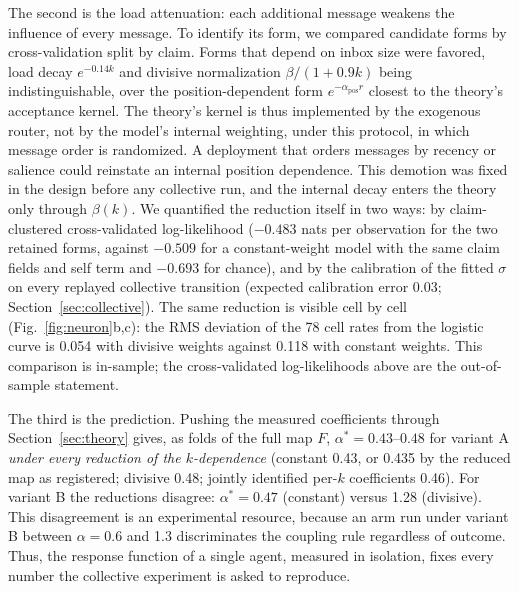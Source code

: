 \documentclass[11pt]{article}
\newcommand{\astar}{\alpha^{*}}
\begin{document}
The second is the load attenuation: each additional message weakens the
influence of every message. To identify its form, we compared candidate
forms by cross-validation split by claim. Forms that depend on inbox size
were favored, load decay $e^{-0.14k}$ and divisive normalization
$\beta/(1+0.9k)$ being indistinguishable, over the position-dependent form
$e^{-\alpha_{\mathrm{pos}} r}$ closest to the theory's acceptance kernel.
The theory's kernel is thus implemented by the exogenous router, not by the
model's internal weighting, under this protocol, in which message order is
randomized. A deployment that orders messages by recency or salience could
reinstate an internal position dependence. This demotion was fixed in the
design before any collective run, and the internal decay enters the theory
only through $\beta(k)$. We quantified the reduction itself in two ways: by
claim-clustered cross-validated log-likelihood ($-0.483$ nats per
observation for the two retained forms, against $-0.509$ for a
constant-weight model with the same claim fields and self term and $-0.693$
for chance), and by the calibration of the fitted $\sigma$ on every
replayed collective transition (expected calibration error 0.03;
Section~\ref{sec:collective}). The same reduction is visible cell by cell
(Fig.~\ref{fig:neuron}b,c): the RMS deviation of the 78 cell rates from the
logistic curve is 0.054 with divisive weights against 0.118 with constant
weights. This comparison is in-sample; the cross-validated log-likelihoods
above are the out-of-sample statement.

The third is the prediction. Pushing the measured coefficients through
Section~\ref{sec:theory} gives, as folds of the full map $F$,
$\astar = 0.43$--$0.48$ for variant A \emph{under every reduction of the
$k$-dependence} (constant 0.43, or 0.435 by the reduced map as registered;
divisive 0.48; jointly identified per-$k$ coefficients 0.46). For variant B
the reductions disagree: $\astar = 0.47$ (constant) versus 1.28 (divisive).
This disagreement is an experimental resource, because an arm run under
variant B between $\alpha = 0.6$ and 1.3 discriminates the coupling rule
regardless of outcome. Thus, the response function of a single agent,
measured in isolation, fixes every number the collective experiment is
asked to reproduce.
\end{document}
